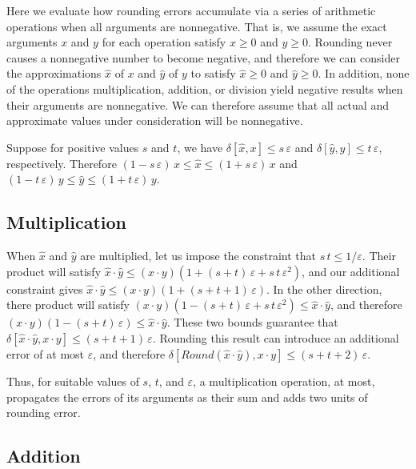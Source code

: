 \documentclass[letterpaper,USenglish,cleveref, autoref, thm-restate]{lipics-v2021}
\newcommand{\approximate}[1]{\hat{#1}}
\newcommand{\approxx}{\approximate{x}}
\newcommand{\approxy}{\approximate{y}}
\newcommand{\round}{\mathit{Round}}
\newcommand{\aerror}{\delta}
\newcommand{\roundepsilon}{\varepsilon}
\begin{document}
Here we evaluate how rounding errors accumulate via a series of
arithmetic operations when all arguments are nonnegative.
That is, we assume the exact arguments $x$ and $y$ for each operation satisfy $x \geq 0$ and $y \geq 0$.
Rounding never causes a nonnegative number to become negative, and therefore we can
consider the approximations $\approxx$ of  $x$ and $\approxy$ of $y$ to satisfy $\approxx \geq 0$ and $\approxy \geq 0$.
In addition, none of the operations multiplication, addition, or division yield negative results when their arguments are nonnegative.
We can therefore
assume that all actual and approximate values under consideration will
be nonnegative.

Suppose for positive values $s$ and $t$, we have
$\aerror[\approxx, x] \leq s\, \roundepsilon$ and
$\aerror[\approxy, y] \leq t\, \roundepsilon$, respectively.
Therefore
$(1-s\,\roundepsilon)\, x \leq \approxx \leq (1+s\,\roundepsilon)\, x$ and
$(1-t\,\roundepsilon)\, y \leq \approxy \leq (1+t\,\roundepsilon)\, y$.


\subsection{Multiplication}

When $\approxx$ and $\approxy$ are multiplied, let us impose the constraint that $s\,t \leq 1/\roundepsilon$.
Their product will satisfy
$\approxx \cdot \approxy \leq (x\cdot y) (1 + (s+t)\,\roundepsilon + s\,t\,\roundepsilon^2)$, and our additional constraint gives
$\approxx \cdot \approxy \leq (x\cdot y) (1 + (s+t+1)\,\roundepsilon)$.
In the other direction, there product will satisfy
$(x\cdot y) (1 - (s+t)\,\roundepsilon + s\,t\,\roundepsilon^2) \leq \approxx \cdot \approxy$, and therefore
$(x\cdot y) (1 - (s+t)\,\roundepsilon) \leq \approxx \cdot \approxy$.  These two bounds guarantee that
$\aerror[\approxx \cdot \approxy, x \cdot y] \leq (s+t+1)\,\roundepsilon$.
Rounding this result can introduce an additional error of at most $\roundepsilon$, and therefore
$\aerror[\round(\approxx \cdot \approxy), x \cdot y] \leq (s+t+2)\,\roundepsilon$.

Thus, for suitable values of $s$, $t$, and $\roundepsilon$,
a multiplication operation, at most, propagates the errors of its arguments as their sum and adds two units of rounding error.

\subsection{Addition}
\end{document}

